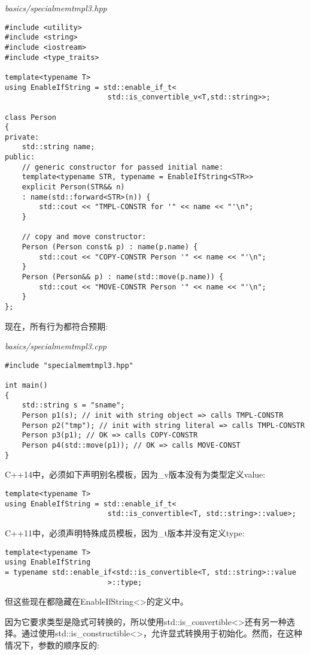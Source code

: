 \noindent
\textit{basics/specialmemtmpl3.hpp}
\begin{lstlisting}[style=styleCXX]
#include <utility>
#include <string>
#include <iostream>
#include <type_traits>

template<typename T>
using EnableIfString = std::enable_if_t<
						std::is_convertible_v<T,std::string>>;

class Person
{
private:
	std::string name;
public:
	// generic constructor for passed initial name:
	template<typename STR, typename = EnableIfString<STR>>
	explicit Person(STR&& n)
	: name(std::forward<STR>(n)) {
		std::cout << "TMPL-CONSTR for '" << name << "'\n";
	}

	// copy and move constructor:
	Person (Person const& p) : name(p.name) {
		std::cout << "COPY-CONSTR Person '" << name << "'\n";
	}
	Person (Person&& p) : name(std::move(p.name)) {
		std::cout << "MOVE-CONSTR Person '" << name << "'\n";
	}
};
\end{lstlisting}

现在，所有行为都符合预期:

\noindent
\textit{basics/specialmemtmpl3.cpp}
\begin{lstlisting}[style=styleCXX]
#include "specialmemtmpl3.hpp"

int main()
{
	std::string s = "sname";
	Person p1(s); // init with string object => calls TMPL-CONSTR
	Person p2("tmp"); // init with string literal => calls TMPL-CONSTR
	Person p3(p1); // OK => calls COPY-CONSTR
	Person p4(std::move(p1)); // OK => calls MOVE-CONST
}
\end{lstlisting}

C++14中，必须如下声明别名模板，因为\_v版本没有为类型定义value:

\begin{lstlisting}[style=styleCXX]
template<typename T>
using EnableIfString = std::enable_if_t<
						std::is_convertible<T, std::string>::value>;
\end{lstlisting}

C++11中，必须声明特殊成员模板，因为\_t版本并没有定义type:

\begin{lstlisting}[style=styleCXX]
template<typename T>
using EnableIfString
= typename std::enable_if<std::is_convertible<T, std::string>::value
						>::type;
\end{lstlisting}

但这些现在都隐藏在EnableIfString<>的定义中。

因为它要求类型是隐式可转换的，所以使用std::is\_convertible<>还有另一种选择。通过使用std::is\_constructible<>，允许显式转换用于初始化。然而，在这种情况下，参数的顺序反的:

